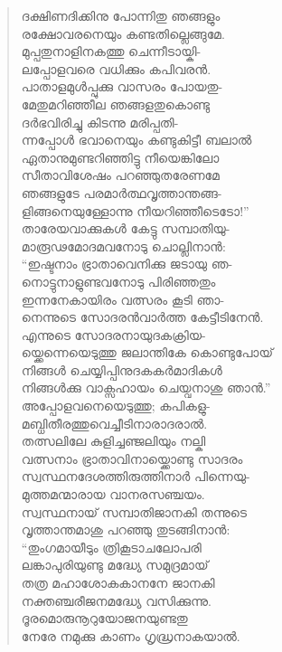 \begin{verse}
ദക്ഷിണദിക്കിനു പോന്നിതു ഞങ്ങളും\\
രക്ഷോവരനെയും കണ്ടതില്ലെങ്ങുമേ.\\
മുപ്പതുനാളിനകത്തു ചെന്നീടായ്കി-\\
ലപ്പോളവരെ വധിക്കും കപിവരന്‍.\\
പാതാളമുള്‍പ്പുക്കു വാസരം പോയതു-\\
മേതുമറിഞ്ഞീല ഞങ്ങളതുകൊണ്ടു\\
ദര്‍ഭവിരിച്ചു കിടന്നു മരിപ്പതി-\\
ന്നപ്പോള്‍ ഭവാനെയും കണ്ടുകിട്ടീ ബലാല്‍\\
ഏതാനുമുണ്ടറിഞ്ഞിട്ടു നീയെങ്കിലോ\\
സീതാവിശേഷം പറഞ്ഞുതരേണമേ\\
ഞങ്ങളുടേ പരമാര്‍ത്ഥവൃത്താന്തങ്ങ-\\
ളിങ്ങനെയുള്ളോന്നു നീയറിഞ്ഞീടെടോ!”\\
താരേയവാക്കുകള്‍ കേട്ടു സമ്പാതിയു-\\
മാരൂഢമോദമവനോടു ചൊല്ലിനാന്‍:\\
“ഇഷ്ടനാം ഭ്രാതാവെനിക്കു ജടായു ഞ-\\
നൊട്ടുനാളുണ്ടവനോടു പിരിഞ്ഞതും\\
ഇന്നനേകായിരം വത്സരം കൂടി ഞാ-\\
നെന്നുടെ സോദരന്‍വാര്‍ത്ത കേട്ടീടിനേന്‍.\\
എന്നുടെ സോദരനായുദകക്രിയ-\\
യ്ക്കെന്നെയെടുത്തു ജലാന്തികേ കൊണ്ടുപോയ്\\
നിങ്ങള്‍ ചെയ്യിപ്പിനുദകകര്‍മാദികള്‍\\
നിങ്ങള്‍ക്കു വാക്സഹായം ചെയ്വനാശു ഞാന്‍.”\\
അപ്പോളവനെയെടുത്തു; കപികളു-\\
മബ്ധിതീരത്തുവെച്ചീടിനാരാദരാല്‍.\\
തത്സലിലേ കുളിച്ചഞ്ജലിയും നല്കി\\
വത്സനാം ഭ്രാതാവിനായ്ക്കൊണ്ടു സാദരം\\
സ്വസ്ഥനദേശത്തിരുത്തിനാര്‍ പിന്നെയു-\\
മുത്തമന്മാരായ വാനരസഞ്ചയം.\\
സ്വസ്ഥനായ് സമ്പാതിജാനകി തന്നുടെ\\
വൃത്താന്തമാശു പറഞ്ഞു തുടങ്ങിനാന്‍:\\
“തുംഗമായീടും ത്രികൂടാചലോപരി\\
ലങ്കാപുരിയുണ്ടു മദ്ധ്യേ സമുദ്രമായ്\\
തത്ര മഹാശോകകാനനേ ജാനകി\\
നക്തഞ്ചരീജനമദ്ധ്യേ വസിക്കുന്നു.\\
ദൂരമൊരുനൂറുയോജനയുണ്ടതു\\
നേരേ നമുക്കു കാണം ഗൃദ്ധ്രനാകയാല്‍.\\

\end{verse}

